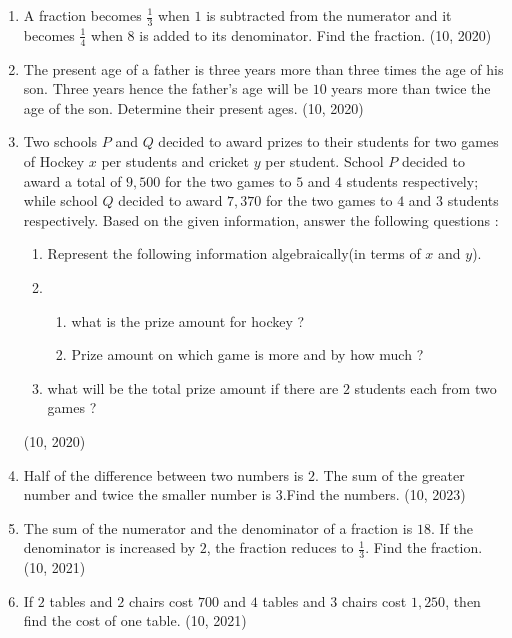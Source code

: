 \begin{enumerate}[label=\thesubsection.\arabic*, ref=\thesubsection.\theenumi]
\item A fraction becomes $\frac{1}{3}$ when $1$ is subtracted from the numerator and it becomes $\frac{1}{4}$ when $8$ is added to its denominator. Find the fraction.
\hfill (10, 2020)
\item The present age of a father is three years more than three times the age of his son. Three years hence the father's age will be $10$ years more than twice the age of the son. Determine their present ages.
\hfill (10, 2020)
\item Two schools $P$ and $Q$ decided to award prizes to their students for two games of Hockey \rupee $x$ per students and cricket \rupee $y$ per student. School $P$
decided to award a total of \rupee $9,500$ for the two games to $5$ and $4$ students respectively; while school $Q$ decided to award \rupee $7,370$ for the two games to $4$ and $3$ students respectively.
Based on the given information, answer the following questions :
\begin{enumerate}
    \item Represent the following information algebraically(in terms of $x$ and $y$).
    \item\begin{enumerate}
\item what is the prize amount for hockey ?
\item Prize amount on which game is more and by how much ?
    \end{enumerate}
    \item what will be the total prize amount if there are $2$ students each from two games ?
\end{enumerate}
\hfill (10, 2020)
\item Half of the difference between two numbers is $2$. The sum of the greater number and twice the smaller number is $3$.Find the numbers.
\hfill (10, 2023)
    \item The sum of the numerator and the denominator of a fraction is $18$. If the denominator is increased by $2$, the fraction reduces to $\frac{1}{3}$. Find the fraction.
\hfill (10, 2021)
    \item If $2$ tables and $2$ chairs cost \rupee $700$ and $4$ tables and $3$ chairs cost \rupee $1,250$, then find the cost of one table.
\hfill (10, 2021)
\end{enumerate}
